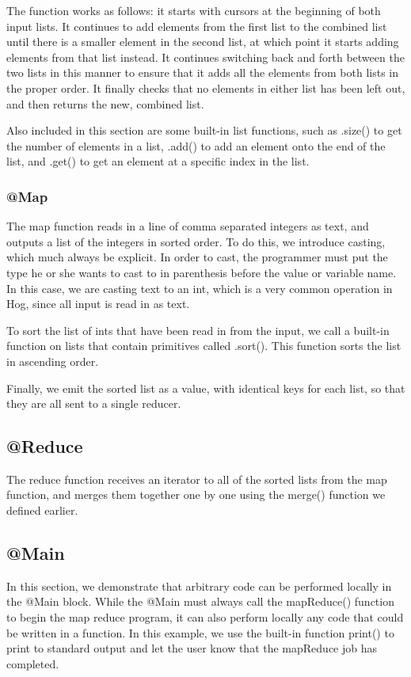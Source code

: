 \documentclass{article} \usepackage{fancyhdr, multicol}
\begin{document}
The function works as follows: it starts with cursors at the beginning of both
input lists. It continues to add elements from the first list to the combined list
until there is a smaller element in the second list, at which point it starts
adding elements from that list instead. It continues switching back and forth
between the two lists in this manner to ensure that it adds all the elements from
both lists in the proper order. It finally checks that no elements in either list
has been left out, and then returns the new, combined list.

Also included in this section are some built-in list functions, such as .size() to get the number of elements in a list, .add() to add an element onto the end of the list, and .get() to get an element at a specific index in the list.

\subsubsection*{@Map}
The map function reads in a line of comma separated integers as text, and outputs a list of the integers in sorted order. To do this, we introduce casting, which much always be explicit. In order to cast, the programmer must put the type he or she wants to cast to in parenthesis before the value or variable name. In this case, we are casting text to an int, which is a very common operation in Hog, since all input is read in as text.

To sort the list of ints that have been read in from the input, we call a built-in function on lists that contain primitives called .sort(). This function sorts the list in ascending order.

Finally, we emit the sorted list as a value, with identical keys for each list, so that they are all sent to a single reducer.

\subsection*{@Reduce}
The reduce function receives an iterator to all of the sorted lists from the map function, and merges them together one by one using the merge() function we defined earlier.

\subsection*{@Main}
In this section, we demonstrate that arbitrary code can be performed locally in the @Main block. While the @Main must always call the mapReduce() function to begin the map reduce program, it can also perform locally any code that could be written in a function. In this example, we use the built-in function print() to print to standard output and let the user know that the mapReduce job has completed.
\end{document}
